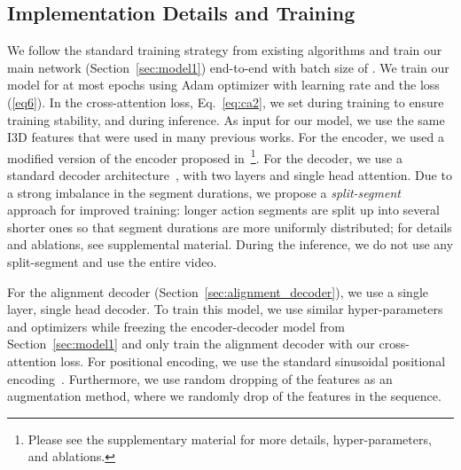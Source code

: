 \subsection{Implementation Details and Training}
We follow the standard training strategy from existing  algorithms \cite{farha2019ms,li2020ms,asrf,asformer,singhania2021coarse} and train our main network (Section~\ref{sec:model1}) end-to-end with batch size of . We train our
model for at most  epochs using Adam optimizer with learning rate  and the loss (\ref{eq6}). 
In the cross-attention loss, Eq.~\eqref{eq:ca2}, we set  during training to ensure training stability, and  during inference.
As input for our model, we use the same I3D \cite{carreira2017quo} features that
were used in many previous works.
For the encoder, we used a modified version of the encoder proposed in~\cite{asformer}\footnote{Please see the supplementary material for more details, hyper-parameters, and ablations.\label{footnote1}}.
For the decoder, we use a standard decoder architecture~\cite{Vaswani:attention:2017}, with two layers and single head attention.
Due to a strong imbalance in the segment durations, we propose a \textit{split-segment} approach for improved training: longer action segments are split up into several shorter ones so that segment durations are more uniformly distributed; for details and ablations, see supplemental material. During the inference, we do not use any split-segment and use the entire video.

For the alignment decoder (Section~\ref{sec:alignment_decoder}), we use a single layer, single head decoder. To train this model, we use similar hyper-parameters and optimizers while freezing the encoder-decoder model from Section~\ref{sec:model1} and only train the alignment decoder with our cross-attention loss. For positional encoding, we use the standard sinusoidal positional encoding~\cite{Vaswani:attention:2017}.
Furthermore, we use random dropping of the features as an augmentation method, where we randomly drop  of the features in the sequence.

